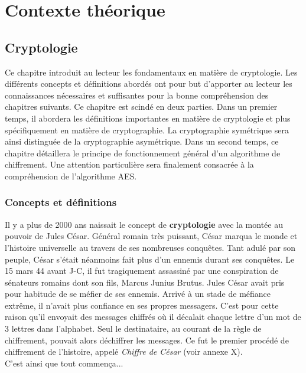 \documentclass[oneside]{book}
\begin{document}
\newpage


\part{Contexte théorique}


\chapter{Cryptologie}

Ce chapitre introduit au lecteur les fondamentaux en matière de cryptologie. Les différents concepts et définitions abordés ont pour but d'apporter au lecteur les connaissances nécessaires et suffisantes pour la bonne compréhension des chapitres suivants. Ce chapitre est scindé en deux parties. Dans un premier temps, il abordera les définitions importantes en matière de cryptologie et plus spécifiquement en matière de cryptographie. La cryptographie symétrique sera ainsi distinguée de la cryptographie asymétrique. Dans un second temps, ce chapitre détaillera le principe de fonctionnement général d'un algorithme de chiffrement. Une attention particulière sera finalement consacrée à la compréhension de l'algorithme AES.

\section{Concepts et définitions}
\label{sec:Concepts}

Il y a plus de 2000 ans naissait le concept de \textbf{cryptologie} avec la montée au pouvoir de Jules César. Général romain très puissant, César marqua le monde et l'histoire universelle au travers de ses nombreuses conquêtes. Tant adulé par son peuple, César s'était néanmoins fait plus d'un ennemis durant ses conquêtes. Le 15 mars 44 avant J-C, il fut tragiquement assassiné par une conspiration de sénateurs romains dont son fils, Marcus Junius Brutus. Jules César avait pris pour habitude de se méfier de ses ennemis. Arrivé à un stade de méfiance extrême, il n'avait plus confiance en ses propres messagers. C'est pour cette raison qu'il envoyait des messages chiffrés où il décalait chaque lettre d'un mot de 3 lettres dans l'alphabet. Seul le destinataire, au courant de la règle de chiffrement, pouvait alors déchiffrer les messages. Ce fut le premier procédé de chiffrement de l'histoire, appelé \textit{Chiffre de César} (voir annexe X). \\
C'est ainsi que tout commença...
\end{document}

